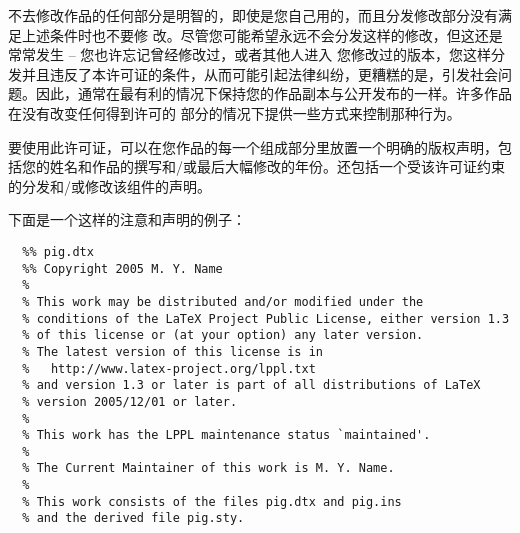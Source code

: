 \begin{LPPLicense}
    不去修改作品的任何部分是明智的，即使是您自己用的，而且分发修改部分没有满足上述条件时也不要修 改。尽管您可能希望永远不会分发这样的修改，但这还是常常发生 – 您也许忘记曾经修改过，或者其他人进入 您修改过的版本，您这样分发并且违反了本许可证的条件，从而可能引起法律纠纷，更糟糕的是，引发社会问 题。因此，通常在最有利的情况下保持您的作品副本与公开发布的一样。许多作品在没有改变任何得到许可的 部分的情况下提供一些方式来控制那种行为。


    \label{LPPL:HowTo}


    要使用此许可证，可以在您作品的每一个组成部分里放置一个明确的版权声明，包括您的姓名和作品的撰写和/或最后大幅修改的年份。还包括一个受该许可证约束的分发和/或修改该组件的声明。

    
    下面是一个这样的注意和声明的例子：
\begin{verbatim}
  %% pig.dtx
  %% Copyright 2005 M. Y. Name
  %
  % This work may be distributed and/or modified under the
  % conditions of the LaTeX Project Public License, either version 1.3
  % of this license or (at your option) any later version.
  % The latest version of this license is in
  %   http://www.latex-project.org/lppl.txt
  % and version 1.3 or later is part of all distributions of LaTeX
  % version 2005/12/01 or later.
  %
  % This work has the LPPL maintenance status `maintained'.
  %
  % The Current Maintainer of this work is M. Y. Name.
  %
  % This work consists of the files pig.dtx and pig.ins
  % and the derived file pig.sty.
\end{verbatim}



\end{LPPLicense}
